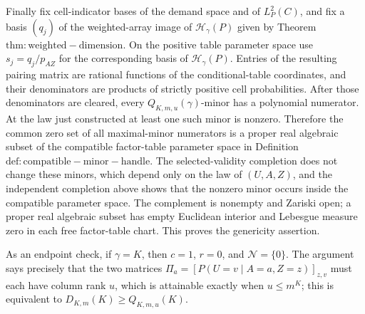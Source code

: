 Finally fix cell-indicator bases of the demand space and of \(L_P^2(C)\), and fix a basis \((q_j)\) of the weighted-array image of \(\mathcal H_\gamma(P)\) given by Theorem \(\mathrm{thm:weighted-dimension}\). On the positive table parameter space use \(s_j=q_j/p_{AZ}\) for the corresponding basis of \(\mathcal H_\gamma(P)\). Entries of the resulting pairing matrix are rational functions of the conditional-table coordinates, and their denominators are products of strictly positive cell probabilities. After those denominators are cleared, every \(Q_{K,m,u}(\gamma)\)-minor has a polynomial numerator. At the law just constructed at least one such minor is nonzero. Therefore the common zero set of all maximal-minor numerators is a proper real algebraic subset of the compatible factor-table parameter space in Definition \(\mathrm{def:compatible-minor-handle}\). The selected-validity completion does not change these minors, which depend only on the law of \((U,A,Z)\), and the independent completion above shows that the nonzero minor occurs inside the compatible parameter space. The complement is nonempty and Zariski open; a proper real algebraic subset has empty Euclidean interior and Lebesgue measure zero in each free factor-table chart. This proves the genericity assertion.

As an endpoint check, if \(\gamma=K\), then \(c=1\), \(r=0\), and \(\mathcal N=\{0\}\). The argument says precisely that the two matrices \(\Pi_a=[P(U=v\mid A=a,Z=z)]_{z,v}\) must each have column rank \(u\), which is attainable exactly when \(u\le m^K\); this is equivalent to \(D_{K,m}(K)\ge Q_{K,m,u}(K)\).